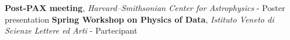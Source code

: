 %
%
%


\begin{contents}
					{\textbf{Post-PAX meeting}, \emph{Harvard–Smithsonian Center for Astrophysics} - Poster presentation }	
					{\textbf{Spring Workshop on Physics of Data}, \emph{Istituto Veneto di Scienze Lettere ed Arti} - Partecipant}
     
\end{contents}
\medskip